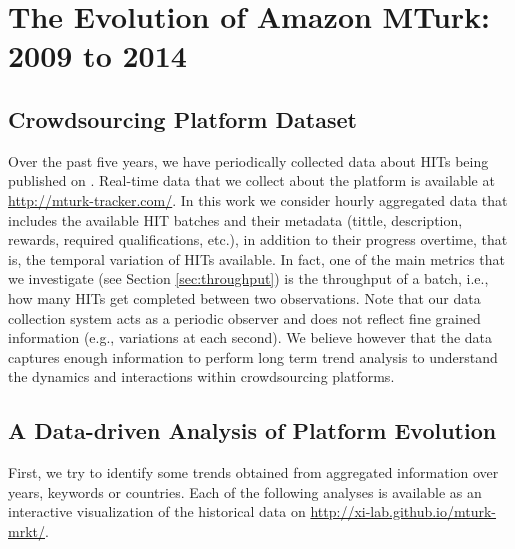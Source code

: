 \section{The Evolution of Amazon MTurk: 2009 to 2014}\label{sec:stats}


\subsection{Crowdsourcing Platform Dataset}
\label{sec:tracker}
Over the past five years, we have periodically collected data about HITs being published on \amt{}.
Real-time data that we collect about the platform is available at \url{http://mturk-tracker.com/}. In this work we consider hourly aggregated data that includes the available HIT batches and their metadata (tittle, description, rewards, required qualifications, etc.), in addition to their progress overtime, that is, the temporal variation of HITs available. In fact, one of the main metrics that we investigate (see Section \ref{sec:throughput}) is the throughput of a batch, i.e.,  how many HITs  get completed between two observations. Note that our data collection system acts  as a periodic observer and does not reflect fine grained information (e.g., variations at each second). We believe however that the data captures enough information to perform long term trend analysis to understand the dynamics and interactions within crowdsourcing platforms.\\

\subsection{A Data-driven Analysis of Platform Evolution}
First, we try to identify some trends obtained from aggregated information over years, keywords or countries.  Each of the following analyses is available as an interactive visualization of the historical data on \url{http://xi-lab.github.io/mturk-mrkt/}.

